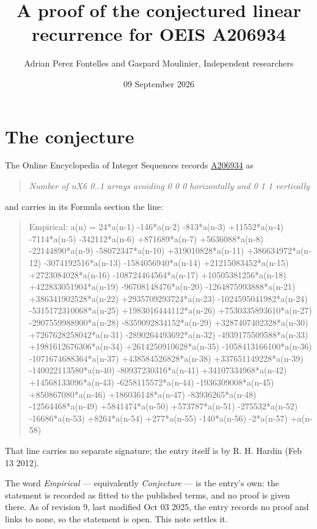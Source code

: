 \documentclass[11pt]{article}
\title{A proof of the conjectured linear recurrence for OEIS A206934}
\author{Adrian Perez Fontelles and Gaspard Moulinier, Independent researchers}
\date{09 September 2026}
\theoremstyle{definition}
\begin{document}
\maketitle
\section{The conjecture}

The Online Encyclopedia of Integer Sequences records \href{https://oeis.org/A206934}{A206934} as

\begin{quote}\itshape Number of nX6 0..1 arrays avoiding 0 0 0 horizontally and 0 1 1 vertically\end{quote}

and carries in its Formula section the line:

\begin{quote}\ttfamily Empirical: a(n) = 24*a(n-1) -146*a(n-2) -813*a(n-3) +11552*a(n-4) -7114*a(n-5) -342112*a(n-6) +871689*a(n-7) +5636088*a(n-8) -22144890*a(n-9) -58072347*a(n-10) +319010828*a(n-11) +386634972*a(n-12) -3074192516*a(n-13) -1584056940*a(n-14) +21215083452*a(n-15) +2723084028*a(n-16) -108724464564*a(n-17) +10505381256*a(n-18) +422833051904*a(n-19) -96708148476*a(n-20) -1264875993888*a(n-21) +386341902528*a(n-22) +2935709293724*a(n-23) -1024595041982*a(n-24) -5315172310068*a(n-25) +1983016444112*a(n-26) +7530335893610*a(n-27) -2907559988900*a(n-28) -8359092834152*a(n-29) +3287407402328*a(n-30) +7267628258042*a(n-31) -2890264493692*a(n-32) -4939175509588*a(n-33) +1981612676306*a(n-34) +2614250910628*a(n-35) -1058413166100*a(n-36) -1071674688364*a(n-37) +438584526828*a(n-38) +337651149228*a(n-39) -140022113580*a(n-40) -80937230316*a(n-41) +34107334968*a(n-42) +14568133096*a(n-43) -6258115572*a(n-44) -1936309008*a(n-45) +850867080*a(n-46) +186036148*a(n-47) -83936265*a(n-48) -12564468*a(n-49) +5841474*a(n-50) +573787*a(n-51) -275532*a(n-52) -16686*a(n-53) +8264*a(n-54) +277*a(n-55) -140*a(n-56) -2*a(n-57) +a(n-58)\end{quote}

That line carries no separate signature; the entry itself is by R. H. Hardin (Feb 13 2012).

The word {\itshape Empirical} --- equivalently {\itshape Conjecture} --- is the entry's own: the statement is recorded as fitted to the published terms, and no proof is given there. As of revision 9, last modified Oct 03 2025, the entry records no proof and links to none, so the statement is open. This note settles it.
\end{document}
